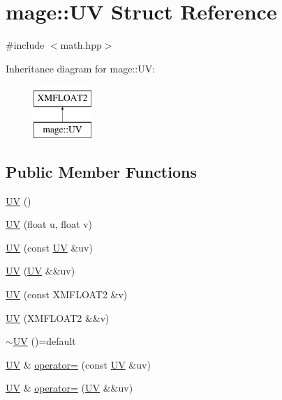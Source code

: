 \hypertarget{structmage_1_1_u_v}{}\section{mage\+:\+:UV Struct Reference}
\label{structmage_1_1_u_v}


{\ttfamily \#include $<$math.\+hpp$>$}

Inheritance diagram for mage\+:\+:UV\+:\begin{figure}[H]
\begin{center}
\leavevmode
\includegraphics[height=2.000000cm]{structmage_1_1_u_v}
\end{center}
\end{figure}
\subsection*{Public Member Functions}
\begin{DoxyCompactItemize}
\item 
\hyperlink{structmage_1_1_u_v_a777c466d20ed20386326299d373b4cb8}{UV} ()
\item 
\hyperlink{structmage_1_1_u_v_ad006b7cb974ee06bbffc947fa84da918}{UV} (float u, float v)
\item 
\hyperlink{structmage_1_1_u_v_a3e31395f3be9fc757040bc242b72fe1f}{UV} (const \hyperlink{structmage_1_1_u_v}{UV} \&uv)
\item 
\hyperlink{structmage_1_1_u_v_ac26053e28b94c8ec7e5bc5df8b52d4eb}{UV} (\hyperlink{structmage_1_1_u_v}{UV} \&\&uv)
\item 
\hyperlink{structmage_1_1_u_v_af81045f21f3d8c6bc684df7215631762}{UV} (const X\+M\+F\+L\+O\+A\+T2 \&v)
\item 
\hyperlink{structmage_1_1_u_v_ad156d5ee7d6c3a63c9a1dccb81b10ede}{UV} (X\+M\+F\+L\+O\+A\+T2 \&\&v)
\item 
\hyperlink{structmage_1_1_u_v_a9389be8cc9bb64861b69f79b44b6dd1b}{$\sim$\+UV} ()=default
\item 
\hyperlink{structmage_1_1_u_v}{UV} \& \hyperlink{structmage_1_1_u_v_abb607259f1710f1344f83ebc21a1a5da}{operator=} (const \hyperlink{structmage_1_1_u_v}{UV} \&uv)
\item 
\hyperlink{structmage_1_1_u_v}{UV} \& \hyperlink{structmage_1_1_u_v_a78eb969d0ff66360614b82aeaf6395aa}{operator=} (\hyperlink{structmage_1_1_u_v}{UV} \&\&uv)
\end{DoxyCompactItemize}


